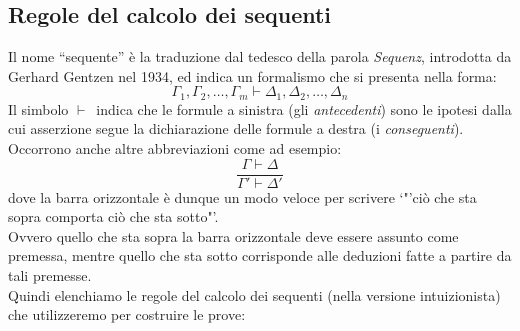 \vspace{0.3 cm}
\subsection{Regole del calcolo dei sequenti}
Il nome "`sequente"' \`e la traduzione dal tedesco della parola {\itshape Sequenz}, introdotta da Gerhard Gentzen nel 1934, ed indica un formalismo che si presenta nella forma:
$$\Gamma_1,\Gamma_2,\dots,\Gamma_m\vdash\Delta_1,\Delta_2,\dots,\Delta_n$$
Il simbolo $\vdash$\ indica che le formule a sinistra (gli {\itshape antecedenti}) sono le ipotesi dalla cui asserzione segue la dichiarazione delle formule a destra (i {\itshape conseguenti}).\\
Occorrono anche altre abbreviazioni come ad esempio:
$$\frac{\Gamma\vdash\Delta}{\Gamma'\vdash\Delta'}$$
dove la barra orizzontale \`e dunque un modo veloce per scrivere `"'ci\`o che sta sopra comporta ci\`o che sta sotto"'.\\
Ovvero quello che sta sopra la barra orizzontale deve essere assunto come premessa, mentre quello che sta sotto corrisponde alle deduzioni fatte a partire da tali premesse.\\
Quindi elenchiamo le regole del calcolo dei sequenti (nella versione intuizionista) che utilizzeremo per costruire le prove:
